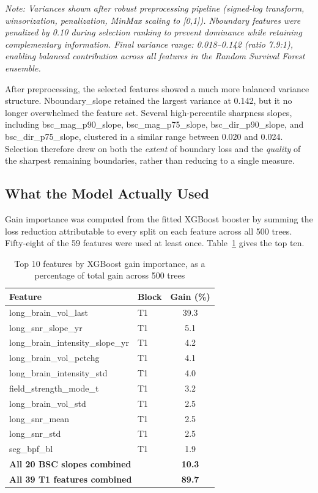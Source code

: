 \documentclass[blue]{ludusofficial}  %
\begin{document}
\textit{Note: Variances shown after robust preprocessing pipeline (signed-log transform, winsorization, penalization, MinMax scaling to [0,1]). Nboundary features were penalized by 0.10 during selection ranking to prevent dominance while retaining complementary information. Final variance range: 0.018--0.142 (ratio 7.9:1), enabling balanced contribution across all features in the Random Survival Forest ensemble.}

After preprocessing, the selected features showed a much more balanced variance structure. Nboundary\_slope retained the largest variance at 0.142, but it no longer overwhelmed the feature set. Several high-percentile sharpness slopes, including bsc\_mag\_p90\_slope, bsc\_mag\_p75\_slope, bsc\_dir\_p90\_slope, and bsc\_dir\_p75\_slope, clustered in a similar range between 0.020 and 0.024. Selection therefore drew on both the \textit{extent} of boundary loss and the \textit{quality} of the sharpest remaining boundaries, rather than reducing to a single measure.

\subsection{What the Model Actually Used}

Gain importance was computed from the fitted XGBoost booster by summing the loss reduction attributable to every split on each feature across all 500 trees. Fifty-eight of the 59 features were used at least once. Table~\ref{tab:xgb-importance} gives the top ten.

\begin{table}[htbp]
\centering
\caption{Top 10 features by XGBoost gain importance, as a percentage of total gain across 500 trees}
\label{tab:xgb-importance}
\begin{tabular}{llc}
\hline
\textbf{Feature} & \textbf{Block} & \textbf{Gain (\%)} \\
\hline
long\_brain\_vol\_last & T1 & 39.3 \\
long\_snr\_slope\_yr & T1 & 5.1 \\
long\_brain\_intensity\_slope\_yr & T1 & 4.2 \\
long\_brain\_vol\_pctchg & T1 & 4.1 \\
long\_brain\_intensity\_std & T1 & 4.0 \\
field\_strength\_mode\_t & T1 & 3.2 \\
long\_brain\_vol\_std & T1 & 2.5 \\
long\_snr\_mean & T1 & 2.5 \\
long\_snr\_std & T1 & 2.5 \\
seg\_bpf\_bl & T1 & 1.9 \\
\hline
\multicolumn{2}{l}{\textbf{All 20 BSC slopes combined}} & \textbf{10.3} \\
\multicolumn{2}{l}{\textbf{All 39 T1 features combined}} & \textbf{89.7} \\
\hline
\end{tabular}
\end{table}
\end{document}
